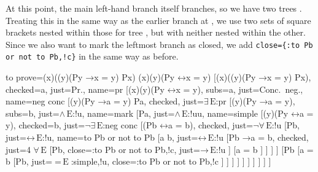 \documentclass[10pt,british,a4paper,doc2]{ltxdoc}
\newcommand*{\lif}{\ensuremath{\mathbin{\rightarrow}}}
\newcommand*{\liff}{\ensuremath{\mathbin{\leftrightarrow}}}
\newcommand*{\elim}{\,\text{E}}
\begin{document}
At this point, the main left-hand branch itself branches, so we have two trees \nyth*{}.
Treating this in the same way as the earlier branch at \nyth[8], we use two sets of square brackets nested within those for tree \nyth{}, but with neither nested within the other.
Since we also want to mark the leftmost branch as closed, we add \verb|close={:to Pb or not to Pb,!c}| in the same way as before.
\begin{latexcode}
\begin{tableau}
  {
    to prove={(\exists x)((\forall y)(Py \lif x = y) \land Px) \sststile{}{} (\exists x)(\forall y)(Py \liff x = y)}
  }
  [{(\exists x)((\forall y)(Py \lif x = y) \land Px)}, checked=a, just=Pr., name=pr
    [{\lnot (\exists x)(\forall y)(Py \liff x = y)}, subs=a, just=Conc.~neg., name=neg conc
      [{(\forall y)(Py \lif a = y) \land Pa}, checked, just=$\exists\elim$:pr
        [{(\forall y)(Py \lif a = y)}, subs=b, just=$\land\elim$:!u, name=mark
          [Pa, just=$\land\elim$:!uu, name=simple
            [{\lnot (\forall y)(Py \liff a = y)}, checked=b, just=$\lnot\exists\elim$:neg conc
              [{\lnot (Pb \liff a = b)}, checked, just=$\lnot\forall\elim$:!u
                [Pb, just=$\liff\elim$:!u, name=to Pb or not to Pb
                 [a \neq b, just=$\liff\elim$:!u
                  [{Pb \lif a = b}, checked, just=4 $\forall\elim$
                      [\lnot Pb, close={:to Pb or not to Pb,!c}, just=$\lif\elim$:!u
                      ]
                      [{a = b}
                      ]
                  ]
                ]
                ]
                [\lnot Pb
                 [{a = b}
                    [Pb, just={$=\elim$:{simple,!u}}, close={:to Pb or not to Pb,!c}
                    ]
                 ]
                ]
              ]
            ]
          ]
        ]
      ]
    ]
  ]
\end{tableau}
\end{latexcode}
\end{document}
